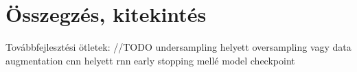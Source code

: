 \chapter{Összegzés, kitekintés} %
\label{ch:sum}

Továbbfejlesztési ötletek:
//TODO undersampling helyett oversampling vagy data augmentation
cnn helyett rnn 
early stopping mellé model checkpoint